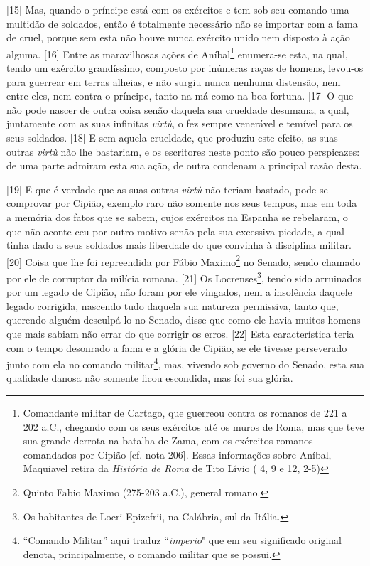 {[}15{]} Mas, quando o príncipe está com os exércitos e tem sob seu
comando uma multidão de soldados, então é totalmente necessário não se
importar com a fama de cruel, porque sem esta não houve nunca exército
unido nem disposto à ação alguma. {[}16{]} Entre as maravilhosas ações
de Aníbal\footnote{Comandante militar de Cartago, que guerreou contra os
  romanos de 221 a 202 a.C., chegando com os seus exércitos até os muros
  de Roma, mas que teve sua grande derrota na batalha de Zama, com os
  exércitos romanos comandados por Cipião {[}cf. nota 206{]}. Essas
  informações sobre Aníbal, Maquiavel retira da \emph{História de Roma}
  de Tito Lívio ( 4, 9 e  12, 2-5)} enumera-se esta, na qual,
tendo um exército grandíssimo, composto por inúmeras raças de homens,
levou-os para guerrear em terras alheias, e não surgiu nunca nenhuma
distensão, nem entre eles, nem contra o príncipe, tanto na má como na
boa fortuna. {[}17{]} O que não pode nascer de outra coisa senão daquela
sua crueldade desumana, a qual, juntamente com as suas infinitas
\emph{virtù}, o fez sempre venerável e temível para os seus soldados.
{[}18{]} E sem aquela crueldade, que produziu este efeito, as suas
outras \emph{virtù} não lhe bastariam, e os escritores neste ponto são
pouco perspicazes: de uma parte admiram esta sua ação, de outra condenam
a principal razão desta.

{[}19{]} E que é verdade que as suas outras \emph{virtù} não teriam
bastado, pode-se comprovar por Cipião, exemplo raro não somente nos seus
tempos, mas em toda a memória dos fatos que se sabem, cujos exércitos na
Espanha se rebelaram, o que não aconte ceu por outro motivo senão pela
sua excessiva piedade, a qual tinha dado a seus soldados mais liberdade
do que convinha à disciplina militar. {[}20{]} Coisa que lhe foi
repreendida por Fábio Maximo\footnote{Quinto Fabio Maximo (275-203
  a.C.), general romano.} no Senado, sendo chamado por ele de corruptor
da milícia romana. {[}21{]} Os Locrenses\footnote{Os habitantes de Locri
  Epizefrii, na Calábria, sul da Itália.}, tendo sido arruinados por um
legado de Cipião, não foram por ele vingados, nem a insolência daquele
legado corrigida, nascendo tudo daquela sua natureza permissiva, tanto
que, querendo alguém desculpá-lo no Senado, disse que como ele havia
muitos homens que mais sabiam não errar do que corrigir os erros.
{[}22{]} Esta característica teria com o tempo desonrado a fama e a
glória de Cipião, se ele tivesse perseverado junto com ela no comando
militar\footnote{``Comando Militar'' aqui traduz ``\emph{imperio}" que
  em seu significado original denota, principalmente, o comando militar
  que se possui.}, mas, vivendo sob governo do Senado, esta sua
qualidade danosa não somente ficou escondida, mas foi sua glória.

